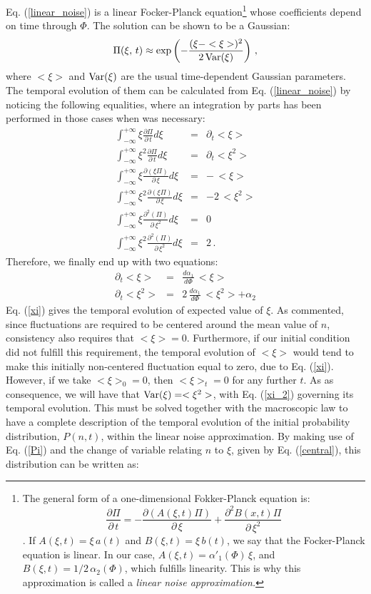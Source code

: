 Eq. (\ref{linear_noise}) is a linear Focker-Planck equation\footnote{The general form of a one-dimensional Fokker-Planck equation is: $$ \frac{\partial\Pi}{\partial\,t} = -\frac{\partial(A(\xi,t)\Pi)}{\partial\,\xi} + \frac{\partial^2 B(x,t)\Pi}{\partial\,\xi^2}$$. If $A(\xi,t)=\xi \, a(t)$ and $ B(\xi,t)=\xi \, b(t)$, we say that the Focker-Planck equation is linear. In our case, $A(\xi,t)=\alpha'_1(\Phi)\,\xi$, and $B(\xi,t) = 1/2\,\alpha_2(\Phi)$, which fulfills linearity. This is why this approximation is called a {\em linear noise approximation.}} whose coefficients depend on time through $\Phi$. The solution can be shown to be a Gaussian:
\begin{equation}
	\label{Pi}
	\Pi(\xi,\,t) \approx \exp\left(-\frac{(\xi-<\xi>)^2}{2\,\textup{Var}(\xi)}\right)\,,
\end{equation}
where $<\xi>$ and $\textup{Var}(\xi)$ are the usual time-dependent Gaussian parameters. The temporal evolution of them can be calculated from Eq. (\ref{linear_noise}) by noticing the following equalities, where an integration by parts has been performed in those cases when was necessary:
\begin{eqnarray}
	\int_{-\infty}^{+\infty}\xi\frac{\partial\Pi}{\partial\,t}d\xi &=& \partial_t<\xi>\\
	\int_{-\infty}^{+\infty}\xi^2\frac{\partial\Pi}{\partial\,t}d\xi &=& \partial_t<\xi^2>\\
	\int_{-\infty}^{+\infty}\xi\frac{\partial(\xi\Pi)}{\partial\,\xi}d\xi &=& -\,<\xi>\\
	\int_{-\infty}^{+\infty}\xi^2\frac{\partial(\xi\Pi)}{\partial\,\xi}d\xi &=& -2\,<\xi^2>\\
	\int_{-\infty}^{+\infty}\xi\frac{\partial^2(\Pi)}{\partial\,\xi^2}d\xi &=& 0\\
	\int_{-\infty}^{+\infty}\xi^2\frac{\partial^2(\Pi)}{\partial\,\xi^2}d\xi &=& 2\,.
\end{eqnarray}
Therefore, we finally end up with two equations:
\begin{eqnarray}
	\label{xi}
	\partial_t<\xi>   & = & \frac{d\alpha_1}{d\Phi}\,<\xi>\\
	\partial_t<\xi^2> & = & 2\,\frac{d\alpha_1}{d\Phi}\,<\xi^2>+\alpha_2    
	\label{xi_2}
\end{eqnarray}
Eq. (\ref{xi}) gives the temporal evolution of expected value of $\xi$. As commented, since fluctuations are required to be centered around the mean value of $n$, consistency also requires that $<\xi>=0$. Furthermore, if our initial condition did not fulfill this requirement, the temporal evolution of $<\xi>$ would tend to make this initially non-centered fluctuation equal to zero, due to Eq. (\ref{xi}). However, if we take $<\xi>_0=0$, then $<\xi>_t=0$ for any further $t$. As as consequence, we will have that $\textup{Var}(\xi)=<\xi^2>$, with Eq. (\ref{xi_2}) governing its temporal evolution. This must be solved together with the macroscopic law to have a complete description of the temporal evolution of the initial probability distribution, $P(n,t)$, within the linear noise approximation. By making use of Eq. (\ref{Pi}) and the change of variable relating $n$ to $\xi$, given by Eq. (\ref{central}), this distribution can be written as:
